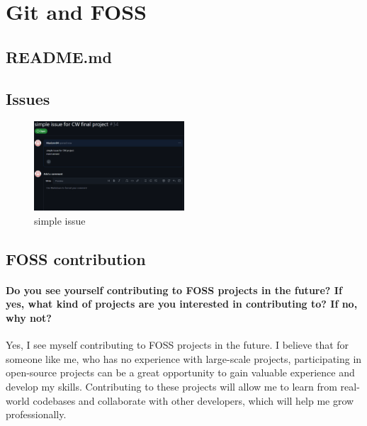 \documentclass[11pt]{article}
\begin{document}
\section{Git and FOSS}
\subsection{README.md}


\subsection{Issues}
\begin{figure}[h]
    \centering
    \includegraphics[width=0.5\textwidth]{issue.png}
    \caption{simple issue}
\end{figure}


\subsection{FOSS contribution}
\paragraph{Do you see yourself contributing to FOSS projects in the future? If yes, what kind of
 projects are you interested in contributing to? If no, why not?\newline}

\noindent Yes, I see myself contributing to FOSS projects in the future. I believe that for someone like me, who has no experience with large-scale projects, participating in open-source projects can be a great opportunity to gain valuable experience and develop my skills. Contributing to these projects will allow me to learn from real-world codebases and collaborate with other developers, which will help me grow professionally.
\end{document}
